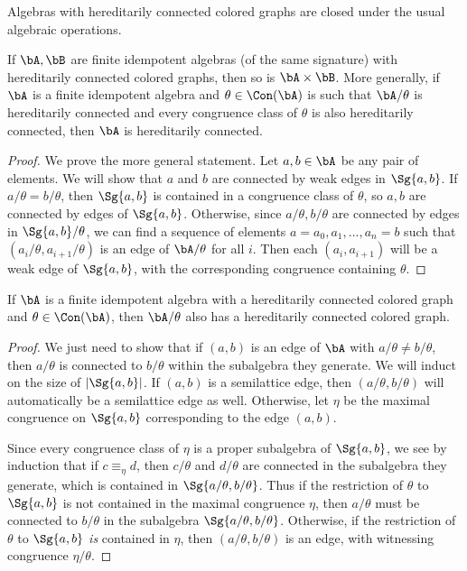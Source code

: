 Algebras with hereditarily connected colored graphs are closed under the usual algebraic operations.

\begin{prop}\label{hereditarily-connected-product} If $\bA, \bB$ are finite idempotent algebras (of the same signature) with hereditarily connected colored graphs, then so is $\bA \times \bB$. More generally, if $\bA$ is a finite idempotent algebra and $\theta \in \Con(\bA)$ is such that $\bA/\theta$ is hereditarily connected and every congruence class of $\theta$ is also hereditarily connected, then $\bA$ is hereditarily connected.
\end{prop}
\begin{proof} We prove the more general statement. Let $a,b \in \bA$ be any pair of elements. We will show that $a$ and $b$ are connected by weak edges in $\Sg\{a,b\}$. If $a/\theta = b/\theta$, then $\Sg\{a,b\}$ is contained in a congruence class of $\theta$, so $a,b$ are connected by edges of $\Sg\{a,b\}$. Otherwise, since $a/\theta, b/\theta$ are connected by edges in $\Sg\{a,b\}/\theta$, we can find a sequence of elements $a = a_0, a_1, ..., a_n = b$ such that $(a_i/\theta,a_{i+1}/\theta)$ is an edge of $\bA/\theta$ for all $i$. Then each $(a_i,a_{i+1})$ will be a weak edge of $\Sg\{a,b\}$, with the corresponding congruence containing $\theta$.
\end{proof}

\begin{prop} If $\bA$ is a finite idempotent algebra with a hereditarily connected colored graph and $\theta \in \Con(\bA)$, then $\bA/\theta$ also has a hereditarily connected colored graph.
\end{prop}
\begin{proof} We just need to show that if $(a,b)$ is an edge of $\bA$ with $a/\theta \ne b/\theta$, then $a/\theta$ is connected to $b/\theta$ within the subalgebra they generate. We will induct on the size of $|\Sg\{a,b\}|$. If $(a,b)$ is a semilattice edge, then $(a/\theta,b/\theta)$ will automatically be a semilattice edge as well. Otherwise, let $\eta$ be the maximal congruence on $\Sg\{a,b\}$ corresponding to the edge $(a,b)$.

Since every congruence class of $\eta$ is a proper subalgebra of $\Sg\{a,b\}$, we see by induction that if $c \equiv_\eta d$, then $c/\theta$ and $d/\theta$ are connected in the subalgebra they generate, which is contained in $\Sg\{a/\theta,b/\theta\}$. Thus if the restriction of $\theta$ to $\Sg\{a,b\}$ is not contained in the maximal congruence $\eta$, then $a/\theta$ must be connected to $b/\theta$ in the subalgebra $\Sg\{a/\theta,b/\theta\}$. Otherwise, if the restriction of $\theta$ to $\Sg\{a,b\}$ \emph{is} contained in $\eta$, then $(a/\theta,b/\theta)$ is an edge, with witnessing congruence $\eta/\theta$.
\end{proof}

